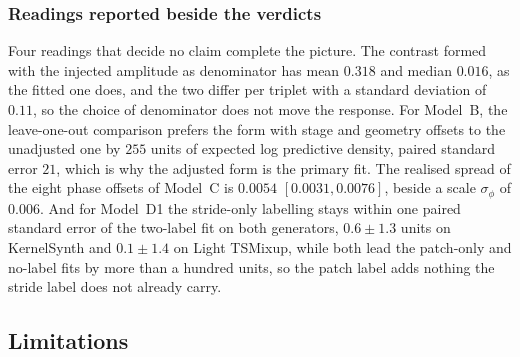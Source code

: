 \subsubsection{Readings reported beside the verdicts}

Four readings that decide no claim complete the picture. The contrast formed with the injected amplitude as denominator has mean $0.318$ and median $0.016$, as the fitted one does, and the two differ per triplet with a standard deviation of $0.11$, so the choice of denominator does not move the response. For Model~B, the leave-one-out comparison prefers the form with stage and geometry offsets to the unadjusted one by $255$ units of expected log predictive density, paired standard error $21$, which is why the adjusted form is the primary fit. The realised spread of the eight phase offsets of Model~C is $0.0054$ $[0.0031,0.0076]$, beside a scale $\sigma_\phi$ of $0.006$. And for Model~D1 the stride-only labelling stays within one paired standard error of the two-label fit on both generators, $0.6\pm1.3$ units on KernelSynth and $0.1\pm1.4$ on Light TSMixup, while both lead the patch-only and no-label fits by more than a hundred units, so the patch label adds nothing the stride label does not already carry.

\subsection{Limitations}

